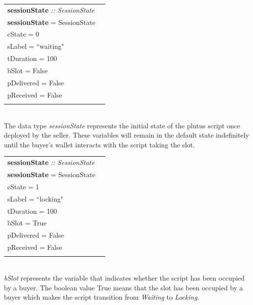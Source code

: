 \documentclass[12pt]{article}
\begin{document}
\begin{tabular}{lr}
\textbf{sessionState} \emph{:: SessionState}\\
\textbf{sessionState}  = SessionState  \textbraceleft{}
\\ \hspace{54mm}cState = 0
\\ \hspace{54mm}sLabel = ``waiting"
\\ \hspace{54mm}tDuration = 100
\\ \hspace{54mm}bSlot = False
\\ \hspace{54mm}pDelivered = False
\\ \hspace{54mm}pReceived = False
\\\hspace{51mm}\textbraceright{} 
\end{tabular}
\\

 The data type \emph{sessionState} represents the initial state of the plutus script once deployed by the seller. These variables will remain in the default state indefinitely until the buyer's wallet interacts with the script taking the slot.
\\

\begin{tabular}{lr}
\textbf{sessionState} \emph{:: SessionState}\\
\textbf{sessionState}  = SessionState  \textbraceleft{}
\\ \hspace{54mm}cState = 1
\\ \hspace{54mm}sLabel = ``locking"
\\ \hspace{54mm}tDuration = 100
\\ \hspace{54mm}bSlot = True
\\ \hspace{54mm}pDelivered = False
\\ \hspace{54mm}pReceived = False
\\\hspace{51mm}\textbraceright{} 
\end{tabular}
\\

 \emph{bSlot} represents the variable that indicates whether the script has been occupied by a buyer. The boolean value True means that the slot has been occupied by a buyer which makes the script transition from \emph{Waiting} to \emph{Locking}.
\\
\end{document}
